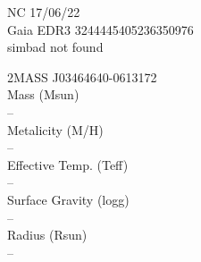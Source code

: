 NC 17/06/22\\
Gaia EDR3 3244445405236350976\\
simbad not found

2MASS J03464640-0613172\\
Mass (Msun)\\
--\\
Metalicity (M/H)\\
--\\
Effective Temp. (Teff)\\
--\\
Surface Gravity (logg)\\
--\\
Radius (Rsun)\\
--\\